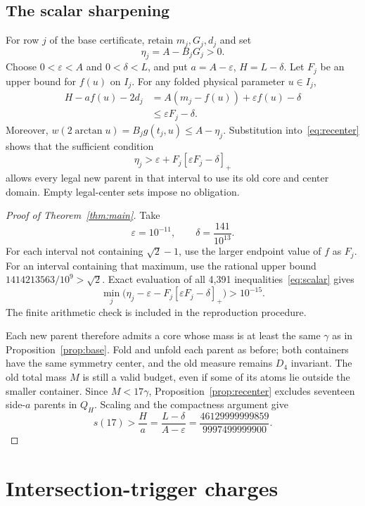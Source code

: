 \documentclass[11pt]{article}
\newcommand{\Q}{Q}
\begin{document}
\subsection{The scalar sharpening}

For row $j$ of the base certificate, retain $m_j,G_j,d_j$ and set
\[
  \eta_j=A-B_jG_j>0.
\]
Choose $0<\varepsilon<A$ and $0<\delta<L$, and put
$a=A-\varepsilon$, $H=L-\delta$. Let $F_j$ be an upper bound for $f(u)$ on
$I_j$. For any folded physical parameter $u\in I_j$,
\begin{align*}
  H-af(u)-2d_j
    &=A(m_j-f(u))+\varepsilon f(u)-\delta\\
    &\le\varepsilon F_j-\delta.
\end{align*}
Moreover, $w(2\arctan u)=B_jg(t_j,u)\le A-\eta_j$.
Substitution into~\eqref{eq:recenter} shows that the sufficient condition
\begin{equation}\label{eq:scalar}
  \eta_j>\varepsilon+F_j[\varepsilon F_j-\delta]_+
\end{equation}
allows every legal new parent in that interval to use its old core and center
domain. Empty legal-center sets impose no obligation.

\begin{proof}[Proof of Theorem~\ref{thm:main}]
Take
\[
  \varepsilon=10^{-11},\qquad \delta=\frac{141}{10^{13}}.
\]
For each interval not containing $\sqrt2-1$, use the larger endpoint value
of $f$ as $F_j$. For an interval containing that maximum, use the rational
upper bound $1414213563/10^9>\sqrt2$. Exact evaluation of all 4,391
inequalities~\eqref{eq:scalar} gives
\[
  \min_j\bigl(\eta_j-\varepsilon
       -F_j[\varepsilon F_j-\delta]_+\bigr)>10^{-15}.
\]
The finite arithmetic check is included in the reproduction procedure.

Each new parent therefore admits a core whose mass is at least the same
$\gamma$ as in Proposition~\ref{prop:base}. Fold and unfold each parent as
before; both containers have the same symmetry center, and the old measure
remains $D_4$ invariant. The old total mass $M$ is still a valid budget,
even if some of its atoms lie outside the smaller container. Since
$M<17\gamma$, Proposition~\ref{prop:recenter} excludes seventeen side-$a$
parents in $\Q_H$. Scaling and the compactness argument give
\[
  s(17)>\frac{H}{a}
  =\frac{L-\delta}{A-\varepsilon}
  =\frac{46129999999859}{9997499999900}.
\]
\end{proof}

\section{Intersection-trigger charges}\label{sec:triggers}
\end{document}
